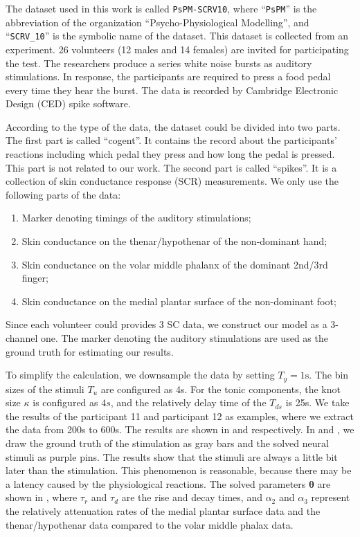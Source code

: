 \documentclass[10pt,conference]{ieeeconf}
\providecommand{\rm}[1]{\mathrm{#1}}
\begin{document}
The dataset used in this work is called \texttt{PsPM-SCRV10}\cite{bach2014pspm}, where ``\texttt{PsPM}'' is the abbreviation of the organization ``Psycho-Physiological Modelling'', and ``\texttt{SCRV\_10}'' is the symbolic name of the dataset. This dataset is collected from an experiment. 26 volunteers (12 males and 14 females) are invited for participating the test. The researchers produce a series white noise bursts as auditory stimulations. In response, the participants are required to press a food pedal every time they hear the burst. The data is recorded by Cambridge Electronic Design (CED) spike software.

According to the type of the data, the dataset could be divided into two parts. The first part is called ``cogent''. It contains the record about the participants' reactions including which pedal they press and how long the pedal is pressed. This part is not related to our work. The second part is called ``spikes''. It is a collection of skin conductance response (SCR) measurements. We only use the following parts of the data:

\begin{enumerate}
  \item Marker denoting timings of the auditory stimulations;
  \item Skin conductance on the thenar/hypothenar of the non-dominant hand;
  \item Skin conductance on the volar middle phalanx of the dominant 2nd/3rd finger;
  \item Skin conductance on the medial plantar surface of the non-dominant foot;
\end{enumerate}

Since each volunteer could provides 3 SC data, we construct our model as a 3-channel one. The marker denoting the auditory stimulations are used as the ground truth for estimating our results.

To simplify the calculation, we downsample the data by setting $T_y=1\rm{s}$. The bin sizes of the stimuli $T_u$ are configured as 4s. For the tonic components, the knot size $\kappa$ is configured as $4s$, and the relatively delay time of the $T_{ds}$ is 25s. We take the results of the participant 11 and participant 12 as examples, where we extract the data from 200s to 600s. The results are shown in  and  respectively. In  and , we draw the ground truth of the stimulation as gray bars and the solved neural stimuli as purple pins. The results show that the stimuli are always a little bit later than the stimulation. This phenomenon is reasonable, because there may be a latency caused by the physiological reactions. The solved parameters $\boldsymbol{\theta}$ are shown in , where $\tau_r$ and $\tau_d$ are the rise and decay times, and $\alpha_2$ and $\alpha_3$ represent the relatively attenuation rates of the medial plantar surface data and the thenar/hypothenar data compared to the volar middle phalax data.
\end{document}
